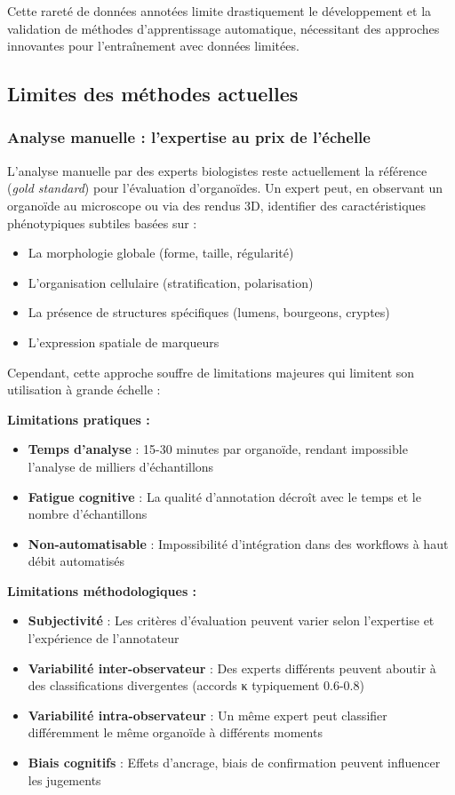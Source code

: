 Cette rareté de données annotées limite drastiquement le développement et la validation de méthodes d'apprentissage automatique, nécessitant des approches innovantes pour l'entraînement avec données limitées.

\subsection{Limites des méthodes actuelles}

\subsubsection{Analyse manuelle : l'expertise au prix de l'échelle}

L'analyse manuelle par des experts biologistes reste actuellement la référence (\textit{gold standard}) pour l'évaluation d'organoïdes. Un expert peut, en observant un organoïde au microscope ou via des rendus 3D, identifier des caractéristiques phénotypiques subtiles basées sur :
\begin{itemize}
    \item La morphologie globale (forme, taille, régularité)
    \item L'organisation cellulaire (stratification, polarisation)
    \item La présence de structures spécifiques (lumens, bourgeons, cryptes)
    \item L'expression spatiale de marqueurs
\end{itemize}

Cependant, cette approche souffre de limitations majeures qui limitent son utilisation à grande échelle :

\textbf{Limitations pratiques :}
\begin{itemize}
    \item \textbf{Temps d'analyse} : 15-30 minutes par organoïde, rendant impossible l'analyse de milliers d'échantillons
    \item \textbf{Fatigue cognitive} : La qualité d'annotation décroît avec le temps et le nombre d'échantillons
    \item \textbf{Non-automatisable} : Impossibilité d'intégration dans des workflows à haut débit automatisés
\end{itemize}

\textbf{Limitations méthodologiques :}
\begin{itemize}
    \item \textbf{Subjectivité} : Les critères d'évaluation peuvent varier selon l'expertise et l'expérience de l'annotateur
    \item \textbf{Variabilité inter-observateur} : Des experts différents peuvent aboutir à des classifications divergentes (accords κ typiquement 0.6-0.8)
    \item \textbf{Variabilité intra-observateur} : Un même expert peut classifier différemment le même organoïde à différents moments
    \item \textbf{Biais cognitifs} : Effets d'ancrage, biais de confirmation peuvent influencer les jugements
\end{itemize}

